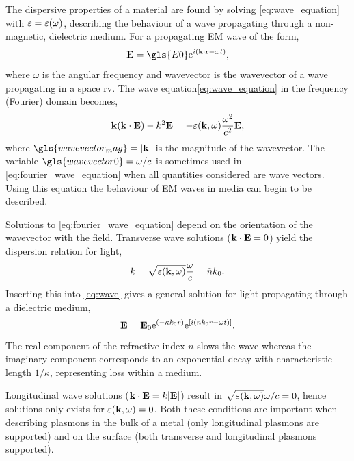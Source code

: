 \documentclass{article}
\begin{document}
The dispersive properties of a material are found by solving \eqref{eq:wave_equation} with $\varepsilon=\varepsilon(\omega)$, describing the behaviour of a wave propagating through a non-magnetic, dielectric medium. For a propagating EM wave of the form,
\begin{equation}
	\vec{E} = \gls{E0} \e^{i(\wv \cdot \vec{r} - \omega t)},
	\label{eq:wave}
\end{equation}
where $\omega$ is the angular frequency and \gls{wavevector} is the wavevector of a wave propagating in a space \gls{rv}. The wave equation\eqref{eq:wave_equation} in the frequency (Fourier) domain becomes,
\begin{equation}
	\mathbf{k}(\mathbf{k}\cdot\mathbf{E}) - k^2\mathbf{E} = -\varepsilon(\mathbf{k}, \omega) \frac{\omega^2}{c^2}\mathbf{E},
	\label{eq:fourier_wave_equation}
\end{equation}
where $\gls{wavevector_mag}=|\wv|$ is the magnitude of the wavevector. The variable $\gls{wavevector0} = \omega/c$ is sometimes used in \eqref{eq:fourier_wave_equation} when all quantities considered are wave vectors. Using this equation the behaviour of EM waves in media can begin to be described.

Solutions to \eqref{eq:fourier_wave_equation} depend on the orientation of the wavevector with the field. Transverse wave solutions ($\mathbf{k}\cdot\mathbf{E}=0$) yield the dispersion relation for light,
\begin{equation}
	k = \sqrt{\varepsilon(\mathbf{k}, \omega)}\frac{\omega}{c}=\tilde{n}k_0.
	\label{eq:light_dispersion}
\end{equation}
Inserting this into \eqref{eq:wave} gives a general solution for light propagating through a dielectric medium,
\begin{equation}
	\mathbf{E} = \mathbf{E}_0 \mathrm{e}^{\left({-\kappa k_0 r}\right)} \mathrm{e}^{\left[{i\left(n k_0 r - \omega t\right)}\right]}.
	\label{eq:gen_wave_solution}
\end{equation}
The real component of the refractive index $n$ slows the wave whereas the imaginary component corresponds to an exponential decay with characteristic length $1/\kappa$, representing loss within a medium.

Longitudinal wave solutions ($\mathbf{k}\cdot\mathbf{E} = k|\mathbf{E}|$) result in $\sqrt{\varepsilon(\mathbf{k},\omega)}\omega/c = 0$, hence solutions only exists for $\varepsilon(\mathbf{k}, \omega)=0$. Both these conditions are important when describing plasmons in the bulk of a metal (only longitudinal plasmons are supported) and on the surface (both transverse and longitudinal plasmons supported).
\end{document}
